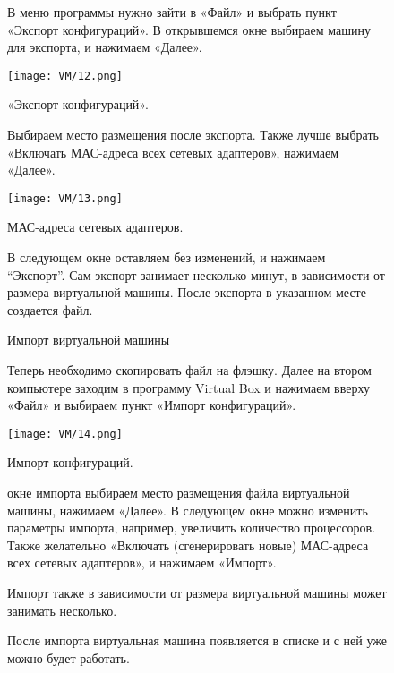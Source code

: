 \begin{figure}
\quad В меню программы нужно зайти в «Файл» и выбрать пункт «Экспорт конфигураций». В открывшемся окне выбираем машину для экспорта, и нажимаем «Далее».

		\centering
		\texttt{[image: VM/12.png]}
\caption{«Экспорт конфигураций».}
\label{ris:image}

\end{figure}

\begin{figure}
\quad Выбираем место размещения после экспорта. Также лучше выбрать «Включать МАС-адреса всех сетевых адаптеров», нажимаем «Далее». 

		\centering
		\texttt{[image: VM/13.png]}
\caption{МАС-адреса сетевых адаптеров.}
\label{ris:image}

\end{figure}

\begin{figure}
\quad В следующем окне оставляем без изменений, и нажимаем “Экспорт”. Сам экспорт занимает несколько минут, в зависимости от размера виртуальной машины. После экспорта в указанном месте создается файл.
\end{figure}

\begin{figure}
\centering
Импорт виртуальной машины
\label{ris:image}
\end{figure}

\begin{figure}
\quad Теперь необходимо скопировать файл на флэшку. Далее на втором компьютере заходим в программу Virtual Box и нажимаем вверху «Файл» и выбираем пункт «Импорт конфигураций».

\centering
		\texttt{[image: VM/14.png]}
\caption{Импорт конфигураций.}
\label{ris:image}
\end{figure}

\begin{figure}
 окне импорта выбираем место размещения файла виртуальной машины, нажимаем «Далее». В следующем окне можно изменить параметры импорта, например, увеличить количество процессоров. Также желательно «Включать (сгенерировать новые) МАС-адреса всех сетевых адаптеров», и нажимаем «Импорт».
\end{figure}

\begin{figure}
\quad Импорт также в зависимости от размера виртуальной машины может занимать несколько.
\end{figure}

\begin{figure}
\quad После импорта виртуальная машина появляется в списке и с ней уже можно будет работать.
\end{figure}
